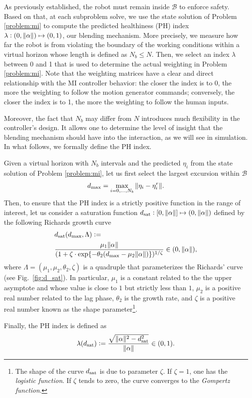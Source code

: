 As previously established, the robot must remain inside $\mathcal{B}$ to enforce safety. Based on that, at each subproblem solve, we use the state solution of Problem \ref{problem:mi} to compute the predicted healthiness (PH) index $\lambda \vcentcolon (0,\|\alpha\|) \mapsto (0, 1)$, our blending mechanism. More precisely, we measure how far the robot is from violating the boundary of the working conditions within a virtual horizon whose length is defined as $N_b \leq N$. Then, we select an index $\lambda$ between 0 and 1 that is used to determine the actual weighting in Problem \ref{problem:mi}. Note that the weighting matrices have a clear and direct relationship with the MI controller behavior: the closer the index is to 0, the more the weighting to follow the motion generator commands; conversely, the closer the index is to 1, the more the weighting to follow the human inputs. 

Moreover, the fact that $N_b$ may differ from $N$ introduces much flexibility in the controller's design. It allows one to determine the level of insight that the blending mechanism should have into the interaction, as we will see in simulation. In what follows, we formally define the PH index.
\begin{definition}[PH index] \normalfont Given a virtual horizon with $N_b$ intervals and the predicted $\eta_i$ from the state solution of Problem \ref{problem:mi}, let us first select the largest excursion within $\mathcal{B}$ 
	\begin{equation}
		d_{\rm max} = \max_{i=0,\dots,N_b}\|\eta_i-\eta^r_i\|.
	\end{equation}
Then, to ensure that the PH index is a strictly positive function in the range of interest, let us consider a saturation function $d_{\rm sat} \vcentcolon [0, \|\alpha\|] \mapsto (0, \|\alpha\|)$ defined by the following Richards growth curve
\begin{align}
		&d_{\rm sat}(d_{\rm max}, \Lambda) \vcentcolon = \nonumber\\
		&\frac{\mu_1\|\alpha\|}{(1 + \zeta \cdot \exp\{-\theta_2(d_{\rm max}-\mu_2\|\alpha\|)\})^{1/\zeta}} \in (0, \|\alpha\|),\label{eq:d_sat}
\end{align}
where $\Lambda = (\mu_1, \mu_2, \theta_2, \zeta)$ is a quadruple that parameterizes the Richards' curve (see Fig.~\ref{fig:d_sat}). In particular, $\mu_1$ is a constant related to the the upper asymptote and whose value is close to $1$ but strictly less than $1$, $\mu_2$ is a positive real number related to the lag phase, $\theta_2$ is the growth rate, and $\zeta$ is a positive real number known as the shape parameter\footnote{The shape of the curve $d_{\rm sat}$ is due to parameter $\zeta$. If $\zeta = 1$, one has the \emph{logistic function}. If $\zeta$ tends to zero, the curve converges to the \emph{Gompertz function}.}.

Finally, the PH index is defined as
\begin{equation}
		\lambda(d_{\rm sat}) \vcentcolon = \frac{\sqrt{\|\alpha\|^2 - d_{\rm sat}^2}}{\|\alpha\|}\in (0,1).\label{eq:ph_index}
\end{equation}
\end{definition} 

